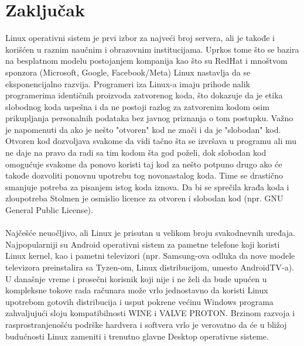 \documentclass[a4paper,14pt]{article}
\begin{document}
\section*{Zaključak}
Linux operativni sistem je prvi izbor za najveći broj servera, ali je takođe i korišćen u raznim naučnim i obrazovnim institucijama. Uprkos tome što se bazira na besplatnom modelu postojanjem kompanija kao što su RedHat i mnoštvom sponzora (Microsoft, Google, Facebook/Meta) Linux nastavlja da se eksponencijalno razvija. Programeri iza Linux-a imaju prihode nalik programerima identičnih proizvoda zatvorenog koda, što dokazuje da je etika slobodnog koda uspešna i da ne postoji razlog za zatvorenim kodom osim prikupljanja personalnih podataka bez javnog priznanja o tom postupku. Važno je napomenuti da ako je nešto "otvoren" kod ne znači i da je "slobodan" kod. Otvoren kod dozvoljava svakome da vidi tačno šta se izvršava u programu ali mu ne daje na pravo da radi sa tim kodom šta god poželi, dok slobodan kod omogućuje svakome da ponovo koristi taj kod za nešto potpuno drugo ako će takođe dozvoliti ponovnu upotrebu tog novonastalog koda. Time se drastično smanjuje potreba za pisanjem istog koda iznova. Da bi se sprečila krađa koda i zloupotreba Stolmen je osmislio licence za otvoren i slobodan kod (npr. GNU General Public License\cite{gpl}).
\\\\
Najčešće neuočljivo, ali Linux je prisutan u velikom broju svakodnevnih uređaja. Najpopularniji su Android operativni sistem za pametne telefone koji koristi Linux kernel, kao i pametni televizori (npr. Samsung-ova odluka da nove modele televizora preinstalira sa Tyzen-om, Linux distribucijom, umesto AndroidTV-a). U današnje vreme i prosečni korisnik koji nije i ne želi da bude upućen u kompleksne tokove rada računara može vrlo jednostavno da koristi Linux upotrebom gotovih distribucija i usput pokrene većinu Windows programa zahvaljujući sloju kompatibilnosti WINE\cite{wine} i VALVE\cite{valve} PROTON\cite{proton}. Brzinom razvoja i rasprostranjenošću podrške hardvera i softvera vrlo je verovatno da će u bližoj budućnosti Linux zameniti i trenutno glavne Desktop operativne sisteme.
\newpage

\renewcommand\refname{Literatura}


\newpage
\end{document}

